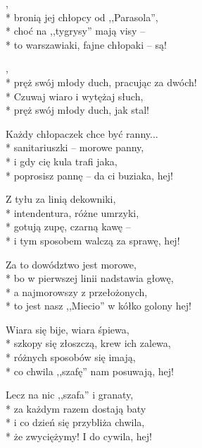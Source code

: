 \begin{lyrics}[longestline={to jest nasz ,,Miecio'' w kółko golony hej!}]

,\\*
bronią jej chłopcy od ,,Parasola'',\\*
choć na ,,tygrysy'' mają visy --\\*
to warszawiaki, fajne chłopaki -- są!

\begin{chorus}
,\\*
pręż swój młody duch, pracując za dwóch!\\*
Czuwaj wiaro i wytężaj słuch,\\*
pręż swój młody duch, jak stal!
\end{chorus}

Każdy chłopaczek chce być ranny...\\*
sanitariuszki -- morowe panny,\\*
i gdy cię kula trafi jaka,\\*
poprosisz pannę -- da ci buziaka, hej!

\chorusref

Z tyłu za linią dekowniki,\\*
intendentura, różne umrzyki,\\*
gotują zupę, czarną kawę --\\*
i tym sposobem walczą za sprawę, hej!

\chorusref

\breaklyrics

Za to dowództwo jest morowe,\\*
bo w pierwszej linii nadstawia głowę,\\*
a najmorowszy z przełożonych,\\*
to jest nasz ,,Miecio'' w kółko golony hej!

\chorusref

Wiara się bije, wiara śpiewa,\\*
szkopy się złoszczą, krew ich zalewa,\\*
różnych sposobów się imają,\\*
co chwila ,,szafę'' nam posuwają, hej!

\chorusref

Lecz na nic ,,szafa'' i granaty,\\*
za każdym razem dostają baty\\*
i co dzień się przybliża chwila,\\*
że zwyciężymy! I do cywila, hej!

\chorusref
\end{lyrics}



